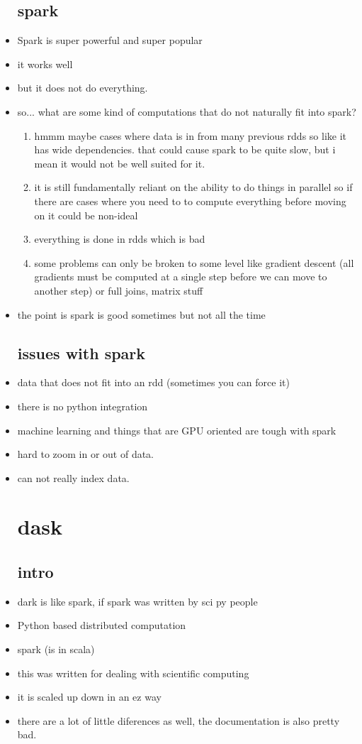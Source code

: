 \documentclass{article}
\begin{document}
\begin{itemize}
\subsection{spark}
\item Spark is super powerful and super popular
\item it works well 
\item but it does not do everything. 
\item so... what are some kind of computations that do not naturally fit into spark? 
\begin{enumerate}
    \item hmmm maybe cases where data is in from many previous rdds so like it has wide dependencies. that could cause spark to be quite slow, but i mean it would not be well suited for it.  
    \item it is still fundamentally reliant  on the ability to do things in parallel so if there are cases where you need to to compute everything before moving on it could be non-ideal
    \item everything is done in rdds which is bad 
    \item some problems can only be broken to some level like gradient descent (all gradients must be computed at a single step before we can move to another step) or full joins, matrix stuff
\end{enumerate}
\item the point is spark is good sometimes but not all the time 
\subsection{issues with spark}
\item data that does not fit into an rdd (sometimes you can force it)
\item there is no python integration  
\item machine learning and things that are GPU oriented are tough with spark 
\item hard to zoom in or out of data. 
\item can not really index data.
\section{dask}
\subsection{intro}
\item dark is like spark, if spark was written by sci py people 
\item Python based distributed computation 
\item spark (is in scala)
\item this was written for dealing with scientific computing
\item it is scaled up down in an ez way 
\item there are a lot of little diferences as well, the documentation is also pretty bad. 

\end{itemize}
\end{document}
